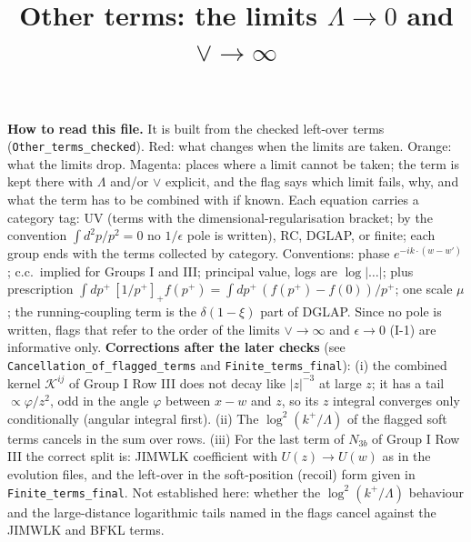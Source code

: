 \documentclass[9pt]{article}
\title{Other terms: the limits $\Lambda\to0$ and $\vee\to\infty$}
\author{}
\date{}
\numberwithin{equation}{section}
\begin{document}
\maketitle
\noindent\textbf{How to read this file.} It is built from the checked left-over terms (\texttt{Other\_terms\_checked}). {\color{red}Red: what changes when the limits are taken.} {\color{orange}Orange: what the limits drop.} {\color{magenta} Magenta: places where a limit cannot be taken; the term is kept there with $\Lambda$ and/or $\vee$ explicit, and the flag says which limit fails, why, and what the term has to be combined with if known.} Each equation carries a category tag: UV (terms with the dimensional-regularisation bracket; by the convention $\int d^{2}p/p^{2}=0$ no $1/\epsilon$ pole is written), RC, DGLAP, or finite; each group ends with the terms collected by category. Conventions: phase $e^{-ik\cdot(w-w')}$; c.c.\ implied for Groups I and III; principal value, logs are $\log|\dots|$; plus prescription $\int dp^{+}\,[1/p^{+}]_{+}f(p^{+})=\int dp^{+}\,(f(p^{+})-f(0))/p^{+}$; one scale $\mu$; the running-coupling term is the $\delta(1-\xi)$ part of DGLAP. Since no pole is written, flags that refer to the order of the limits $\vee\to\infty$ and $\epsilon\to0$ (I-1) are informative only. {\color{red}\textbf{Corrections after the later checks} (see \texttt{Cancellation\_of\_flagged\_terms} and \texttt{Finite\_terms\_final}): (i) the combined kernel $\mathcal{K}^{ij}$ of Group I Row III does not decay like $|z|^{-3}$ at large $z$; it has a tail $\propto\varphi/z^{2}$, odd in the angle $\varphi$ between $x-w$ and $z$, so its $z$ integral converges only conditionally (angular integral first). (ii) The $\log^{2}(k^{+}/\Lambda)$ of the flagged soft terms cancels in the sum over rows. (iii) For the last term of $N_{3b}$ of Group I Row III the correct split is: JIMWLK coefficient with $U(z)\to U(w)$ as in the evolution files, and the left-over in the soft-position (recoil) form given in \texttt{Finite\_terms\_final}.} Not established here: whether the $\log^{2}(k^{+}/\Lambda)$ behaviour and the large-distance logarithmic tails named in the flags cancel against the JIMWLK and BFKL terms.
\end{document}
